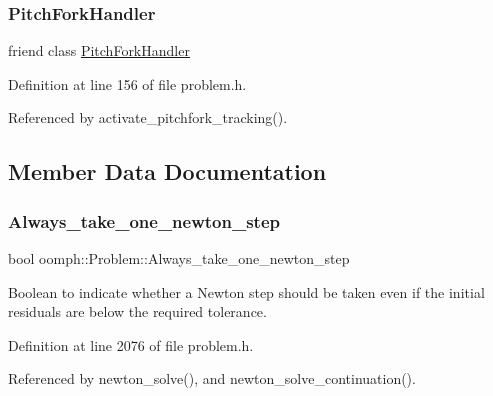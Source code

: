 \subsubsection{\texorpdfstring{Pitch\+Fork\+Handler}{PitchForkHandler}}
{\footnotesize\ttfamily friend class \hyperlink{classoomph_1_1PitchForkHandler}{Pitch\+Fork\+Handler}\hspace{0.3cm}{\ttfamily [friend]}}



Definition at line 156 of file problem.\+h.



Referenced by activate\+\_\+pitchfork\+\_\+tracking().



\subsection{Member Data Documentation}
\mbox{\label{classoomph_1_1Problem_a01d7376ab9cc06e4d5619b34fd39dee2}} 
\subsubsection{\texorpdfstring{Always\+\_\+take\+\_\+one\+\_\+newton\+\_\+step}{Always\_take\_one\_newton\_step}}
{\footnotesize\ttfamily bool oomph\+::\+Problem\+::\+Always\+\_\+take\+\_\+one\+\_\+newton\+\_\+step\hspace{0.3cm}{\ttfamily [protected]}}



Boolean to indicate whether a Newton step should be taken even if the initial residuals are below the required tolerance. 



Definition at line 2076 of file problem.\+h.



Referenced by newton\+\_\+solve(), and newton\+\_\+solve\+\_\+continuation().

\mbox{\label{classoomph_1_1Problem_a8109bf56e9203d248ae30a50bb9cfe90}} 
